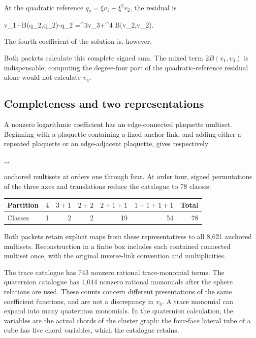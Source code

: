 \documentclass[11pt,a4paper]{article}
\newcounter{none}
\renewcommand{\[}{\begingroup\small\originaldisplaystart}
\renewcommand{\]}{\originaldisplayend\endgroup}
\begin{document}
At the quadratic reference \(q_2=\xi v_1+\xi^2v_2\), the residual is

\[
\xi v_1+B(q_2,q_2)-q_2
=\xi^3v_3+\xi^4 B(v_2,v_2).
\]

The fourth coefficient of the solution is, however,

\[
\]

Both packets calculate this complete signed sum. The mixed term
\(2B(v_1,v_3)\) is indispensable; computing the degree-four part of the
quadratic-reference residual alone would not calculate \(v_4\).

\subsection{Completeness and two
representations}\label{completeness-and-two-representations}

A nonzero logarithmic coefficient has an edge-connected plaquette
multiset. Beginning with a plaquette containing a fixed anchor link, and
adding either a repeated plaquette or an edge-adjacent plaquette, gives
respectively

\[4,,,\]

anchored multisets at orders one through four. At order four, signed
permutations of the three axes and translations reduce the catalogue to
78 classes:

{\def\LTcaptype{none} %
\begin{longtable}[]{@{}lrrrrrr@{}}
\toprule\noalign{}
Partition & \(4\) & \(3+1\) & \(2+2\) & \(2+1+1\) & \(1+1+1+1\) &
Total \\
\midrule\noalign{}
\endhead
\bottomrule\noalign{}
\endlastfoot
Classes & 1 & 2 & 2 & 19 & 54 & 78 \\
\end{longtable}
}

Both packets retain explicit maps from these representatives to all
8,621 anchored multisets. Reconstruction in a finite box includes each
contained connected multiset once, with the original inverse-link
convention and multiplicities.

The trace catalogue has 743 nonzero rational trace-monomial terms. The
quaternion catalogue has 4,044 nonzero rational monomials after the
sphere relations are used. These counts concern different presentations
of the same coefficient functions, and are not a discrepancy in \(v_4\).
A trace monomial can expand into many quaternion monomials. In the
quaternion calculation, the variables are the actual chords of the
cluster graph: the four-face lateral tube of a cube has five chord
variables, which the catalogue retains.
\end{document}
